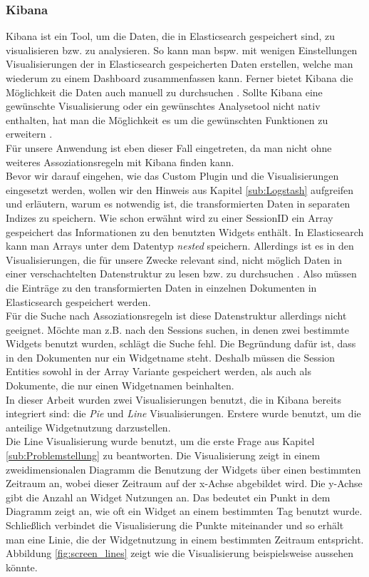 \subsubsection{Kibana}
\label{ssub:Kibana}
Kibana ist ein Tool, um die Daten, die in Elasticsearch gespeichert sind, zu visualisieren bzw. zu analysieren. So kann man bspw. mit wenigen Einstellungen Visualisierungen der in Elasticsearch gespeicherten Daten erstellen, welche man wiederum zu einem Dash\-board zusammenfassen kann. Ferner bietet Kibana die Möglichkeit die Daten auch manuell zu durchsuchen \citep{Ho16}. Sollte Kibana eine gewünschte Visualisierung oder ein gewünschtes Analysetool nicht nativ enthalten, hat man die Möglichkeit es um die gewünschten Funktionen zu erweitern \citep{KibPlug20}.\\
Für unsere Anwendung ist eben dieser Fall eingetreten, da man nicht ohne weiteres Assoziationsregeln mit Kibana finden kann.\\
Bevor wir darauf eingehen, wie das Custom Plugin und die Visualisierungen eingesetzt werden, wollen wir den Hinweis aus Kapitel \ref{sub:Logstash} aufgreifen und erläutern, warum es notwendig ist, die transformierten Daten in separaten Indizes zu speichern. Wie schon erwähnt wird zu einer SessionID ein Array gespeichert das Informationen zu den benutzten Widgets enthält. In Elasticsearch kann man Arrays unter dem Datentyp \textit{nested} speichern. Allerdings ist es in den Visualisierungen, die für unsere Zwecke relevant sind, nicht möglich Daten in einer verschachtelten Datenstruktur zu lesen bzw. zu durchsuchen \citep{KibForum20}. Also müssen die Einträge zu den transformierten Daten in einzelnen Dokumenten in Elasticsearch gespeichert werden.\\
Für die Suche nach Assoziationsregeln ist diese Datenstruktur allerdings nicht geeignet. Möchte man z.B. nach den Sessions suchen, in denen zwei bestimmte Widgets benutzt wurden, schlägt die Suche fehl. Die Begründung dafür ist, dass in den Dokumenten nur ein Widgetname steht. Deshalb müssen die Session Entities sowohl in der Array Variante gespeichert werden, als auch als Dokumente, die nur einen Widgetnamen beinhalten.
\\
In dieser Arbeit wurden zwei Visualisierungen benutzt, die in Kibana bereits integriert sind: die \textit{Pie} und \textit{Line} Visualisierungen. Erstere wurde benutzt, um die anteilige Widgetnutzung darzustellen.\\
Die Line Visualisierung wurde benutzt, um die erste Frage aus Kapitel \ref{sub:Problemstellung} zu beantworten. Die Visualisierung zeigt in einem zweidimensionalen Diagramm die Benutzung der Widgets über einen bestimmten Zeitraum an, wobei dieser Zeitraum auf der x-Achse abgebildet wird. Die y-Achse gibt die Anzahl an Widget Nutzungen an. Das bedeutet ein Punkt in dem Diagramm zeigt an, wie oft ein Widget an einem bestimmten Tag benutzt wurde. Schließlich verbindet die Visualisierung die Punkte miteinander und so erhält man eine Linie, die der Widgetnutzung in einem bestimmten Zeitraum entspricht. Abbildung \ref{fig:screen_lines} zeigt wie die Visualisierung beispielsweise aussehen könnte.

